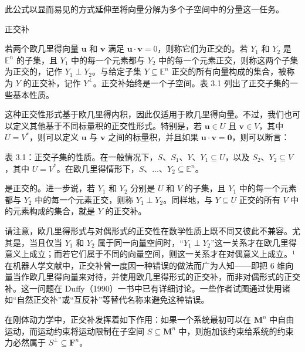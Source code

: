 \documentclass[10pt,a4paper]{book}
\theoremstyle{thmstyle} %
\theoremstyle{defstyle} %
\theoremstyle{prostyle} %
\begin{document}
此公式以显而易见的方式延伸至将向量分解为多个子空间中的分量这一任务。



正交补



若两个欧几里得向量 $\boldsymbol{u}$ 和 $\boldsymbol{v}$ 满足 $\boldsymbol{u} \cdot \boldsymbol{v} = 0$，则称它们为正交的。若 $Y_1$ 和 $Y_2$ 是 $\mathbb{E}^n$ 的子集，且 $Y_1$ 中的每一个元素都与 $Y_2$ 中的每一个元素正交，则称这两个子集为正交的，记作 $Y_1 \perp Y_2$。与给定子集 $Y \subseteq \mathbb{E}^n$ 正交的所有向量构成的集合，被称为 $Y$ 的正交补，记作 $Y^\perp$。正交补始终是一个子空间。表 3.1 列出了正交子集的一些基本性质。



这种正交性形式基于欧几里得内积，因此仅适用于欧几里得向量。不过，我们也可以定义其他基于不同标量积的正交性形式。特别是，若 $\boldsymbol{u} \in U$ 且 $\boldsymbol{v} \in V$，其中 $U = V^*$，则可以定义 $\boldsymbol{u}$ 与 $\boldsymbol{v}$ 之间的标量积，并且如果 $\boldsymbol{u} \cdot \boldsymbol{v} = \mathbf{0}$，则可以断言：



表 3.1：正交子集的性质。在一般情况下，$S$、$S_1$、$Y$、$Y_1 \subseteq U$，以及 $S_2$、$Y_2 \subseteq V$，其中 $U = V^*$。在欧几里得情形下，$S$、$\ldots$、$Y_2 \subseteq \mathbb{E}^n$。





是正交的。进一步说，若 $Y_1$ 和 $Y_2$ 分别是 $U$ 和 $V$ 的子集，且 $Y_1$ 中的每一个元素都与 $Y_2$ 中的每一个元素正交，则称 $Y_1 \perp Y_2$。同样地，与 $Y \subseteq U$ 正交的所有 $V$ 中的元素构成的集合，就是 $Y$ 的正交补。



请注意，欧几里得形式与对偶形式的正交性在数学性质上既不同又彼此不兼容。尤其是，当且仅当 $Y_1$ 和 $Y_2$ 属于同一向量空间时，“$Y_1 \perp Y_2$”这一关系才在欧几里得意义上成立；而若它们属于不同的向量空间，则这一关系才在对偶意义上成立。¹ 在机器人学文献中，正交补曾一度因一种错误的做法而广为人知——即把 6 维向量当作欧几里得向量来对待，并使用欧几里得形式的正交补，而非对偶形式的正交补。这一问题在 Duffy（1990）一书中已有详细讨论。一些作者试图通过使用诸如“自然正交补”或“互反补”等替代名称来避免这种错误。



在刚体动力学中，正交补发挥着如下作用：如果一个系统最初可以在 $\mathbf{M}^{n}$ 中自由运动，而运动约束将运动限制在子空间 $S \subseteq \mathbf{M}^{n}$ 中，则施加该约束给系统的约束力必然属于 $S^{\perp} \subseteq \mathbf{F}^{n}$。
\end{document}
